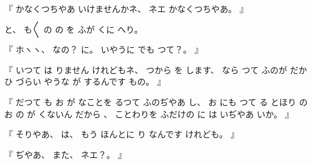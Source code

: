 %
『
かなくつちやあ
いけませんかネ、
%
ネエ
かなくつちやあ。
』

%
と、
%
も〳〵
の
の
を
ふが
くに
へり。

%
『
ホヽヽ、
%
なの？\inhibitglue{}%
に。
%
いやうに
でも
つて？。
』

%
『
いつて
は
りません
けれどもネ、
%
つから
を
します、
%
なら
つて
ふのが
だか
ひ
づらい
やうな
が
するんです
もの。
』

%
『
だつて
も
お
が
なことを
るつて
ふのぢやあ
し、
%
お
にも
つて
る
とほり
の
お
の
が
くないん
だから
、
%
%
ことわりを
ふだけの
に
は
いぢやあ
いか。
』

%
『
そりやあ、
%
は、
%
もう
ほんとに
り
なんです
けれども。
』

%
『
ぢやあ、
%
また、
%
ネエ？。
』

